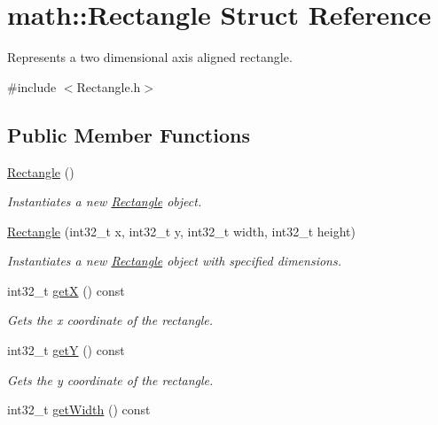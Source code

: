 \hypertarget{structmath_1_1_rectangle}{}\section{math\+::Rectangle Struct Reference}
\label{structmath_1_1_rectangle}


Represents a two dimensional axis aligned rectangle.  




{\ttfamily \#include $<$Rectangle.\+h$>$}

\subsection*{Public Member Functions}
\begin{DoxyCompactItemize}
\item 
\mbox{\hyperlink{structmath_1_1_rectangle_a1335d5ba9662729e62731dbd5de60dae}{Rectangle}} ()
\begin{DoxyCompactList}\small\item\em Instantiates a new \mbox{\hyperlink{structmath_1_1_rectangle}{Rectangle}} object. \end{DoxyCompactList}\item 
\mbox{\hyperlink{structmath_1_1_rectangle_aad99b8b2419021b7f1e820dcd8c6d230}{Rectangle}} (int32\+\_\+t x, int32\+\_\+t y, int32\+\_\+t width, int32\+\_\+t height)
\begin{DoxyCompactList}\small\item\em Instantiates a new \mbox{\hyperlink{structmath_1_1_rectangle}{Rectangle}} object with specified dimensions. \end{DoxyCompactList}\item 
int32\+\_\+t \mbox{\hyperlink{structmath_1_1_rectangle_a240081ee7c4b71f345435899e2ec5f14}{getX}} () const
\begin{DoxyCompactList}\small\item\em Gets the x coordinate of the rectangle. \end{DoxyCompactList}\item 
int32\+\_\+t \mbox{\hyperlink{structmath_1_1_rectangle_a124a70fdc8d5aac728b35330ae487110}{getY}} () const
\begin{DoxyCompactList}\small\item\em Gets the y coordinate of the rectangle. \end{DoxyCompactList}\item 
int32\+\_\+t \mbox{\hyperlink{structmath_1_1_rectangle_a7c3ff10f2c72c4a880c055ce05d67ea0}{get\+Width}} () const

\end{DoxyCompactItemize}
